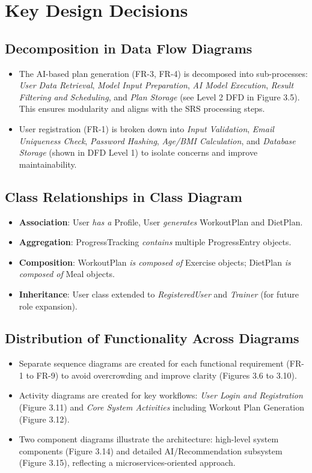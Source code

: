 \documentclass[a4paper,12pt]{report}
\begin{document}
\section{Key Design Decisions}

\subsection{Decomposition in Data Flow Diagrams}
\begin{itemize}
    \item The AI-based plan generation (FR-3, FR-4) is decomposed into sub-processes: \textit{User Data Retrieval}, \textit{Model Input Preparation}, \textit{AI Model Execution}, \textit{Result Filtering and Scheduling}, and \textit{Plan Storage} (see Level 2 DFD in Figure 3.5). This ensures modularity and aligns with the SRS processing steps.
    \item User registration (FR-1) is broken down into \textit{Input Validation}, \textit{Email Uniqueness Check}, \textit{Password Hashing}, \textit{Age/BMI Calculation}, and \textit{Database Storage} (shown in DFD Level 1) to isolate concerns and improve maintainability.
\end{itemize}

\subsection{Class Relationships in Class Diagram}
\begin{itemize}
    \item \textbf{Association}: User \textit{has a} Profile, User \textit{generates} WorkoutPlan and DietPlan.
    \item \textbf{Aggregation}: ProgressTracking \textit{contains} multiple ProgressEntry objects.
    \item \textbf{Composition}: WorkoutPlan \textit{is composed of} Exercise objects; DietPlan \textit{is composed of} Meal objects.
    \item \textbf{Inheritance}: User class extended to \textit{RegisteredUser} and \textit{Trainer} (for future role expansion).
\end{itemize}

\subsection{Distribution of Functionality Across Diagrams}
\begin{itemize}
    \item Separate sequence diagrams are created for each functional requirement (FR-1 to FR-9) to avoid overcrowding and improve clarity (Figures 3.6 to 3.10).
    \item Activity diagrams are created for key workflows: \textit{User Login and Registration} (Figure 3.11) and \textit{Core System Activities} including Workout Plan Generation (Figure 3.12).
    \item Two component diagrams illustrate the architecture: high-level system components (Figure 3.14) and detailed AI/Recommendation subsystem (Figure 3.15), reflecting a microservices-oriented approach.
\end{itemize}
\end{document}
